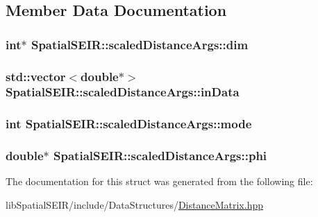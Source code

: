 \subsection{Member Data Documentation}
\hypertarget{structSpatialSEIR_1_1scaledDistanceArgs_a298c111f01f4b8d7950c6b83532fbd97}{
\subsubsection[{dim}]{\setlength{\rightskip}{0pt plus 5cm}int$\ast$ Spatial\-S\-E\-I\-R\-::scaled\-Distance\-Args\-::dim}}\label{structSpatialSEIR_1_1scaledDistanceArgs_a298c111f01f4b8d7950c6b83532fbd97}
\hypertarget{structSpatialSEIR_1_1scaledDistanceArgs_a2f088ea1220ce3eb17762e7ee51c5249}{
\subsubsection[{in\-Data}]{\setlength{\rightskip}{0pt plus 5cm}std\-::vector$<$double$\ast$$>$ Spatial\-S\-E\-I\-R\-::scaled\-Distance\-Args\-::in\-Data}}\label{structSpatialSEIR_1_1scaledDistanceArgs_a2f088ea1220ce3eb17762e7ee51c5249}
\hypertarget{structSpatialSEIR_1_1scaledDistanceArgs_ad9c4a2a8701453b54110ad51164aa39e}{
\subsubsection[{mode}]{\setlength{\rightskip}{0pt plus 5cm}int Spatial\-S\-E\-I\-R\-::scaled\-Distance\-Args\-::mode}}\label{structSpatialSEIR_1_1scaledDistanceArgs_ad9c4a2a8701453b54110ad51164aa39e}
\hypertarget{structSpatialSEIR_1_1scaledDistanceArgs_ade9b8cabc3faa5a2a8c27c18d1a99ec6}{
\subsubsection[{phi}]{\setlength{\rightskip}{0pt plus 5cm}double$\ast$ Spatial\-S\-E\-I\-R\-::scaled\-Distance\-Args\-::phi}}\label{structSpatialSEIR_1_1scaledDistanceArgs_ade9b8cabc3faa5a2a8c27c18d1a99ec6}


The documentation for this struct was generated from the following file\-:\begin{DoxyCompactItemize}
\item 
lib\-Spatial\-S\-E\-I\-R/include/\-Data\-Structures/\hyperlink{DistanceMatrix_8hpp}{Distance\-Matrix.\-hpp}\end{DoxyCompactItemize}
